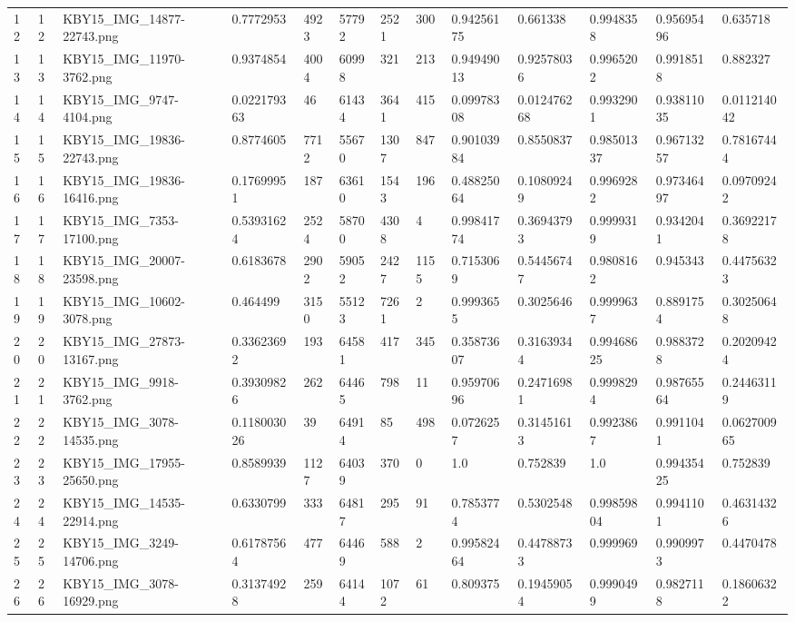 \documentclass[11pt, a4paper, twoside]{report}
\begin{document}
\begin{longtable}[c]{@{}lllllllllllll@{}}
12 & 12 & KBY15\_IMG\_14877-22743.png & 0.7772953 & 4923 & 57792 & 2521 & 300 & 0.94256175 & 0.661338 & 0.9948358 & 0.95695496 & 0.635718 \\
13 & 13 & KBY15\_IMG\_11970-3762.png & 0.9374854 & 4004 & 60998 & 321 & 213 & 0.94949013 & 0.92578036 & 0.9965202 & 0.9918518 & 0.882327 \\
14 & 14 & KBY15\_IMG\_9747-4104.png & 0.022179363 & 46 & 61434 & 3641 & 415 & 0.09978308 & 0.012476268 & 0.9932901 & 0.93811035 & 0.011214042 \\
15 & 15 & KBY15\_IMG\_19836-22743.png & 0.8774605 & 7712 & 55670 & 1307 & 847 & 0.90103984 & 0.8550837 & 0.98501337 & 0.96713257 & 0.78167444 \\
16 & 16 & KBY15\_IMG\_19836-16416.png & 0.17699951 & 187 & 63610 & 1543 & 196 & 0.48825064 & 0.10809249 & 0.9969282 & 0.97346497 & 0.09709242 \\
17 & 17 & KBY15\_IMG\_7353-17100.png & 0.53931624 & 2524 & 58700 & 4308 & 4 & 0.99841774 & 0.36943793 & 0.9999319 & 0.9342041 & 0.36922178 \\
18 & 18 & KBY15\_IMG\_20007-23598.png & 0.6183678 & 2902 & 59052 & 2427 & 1155 & 0.7153069 & 0.54456747 & 0.9808162 & 0.945343 & 0.44756323 \\
19 & 19 & KBY15\_IMG\_10602-3078.png & 0.464499 & 3150 & 55123 & 7261 & 2 & 0.9993655 & 0.3025646 & 0.9999637 & 0.8891754 & 0.30250648 \\
20 & 20 & KBY15\_IMG\_27873-13167.png & 0.33623692 & 193 & 64581 & 417 & 345 & 0.35873607 & 0.31639344 & 0.99468625 & 0.9883728 & 0.20209424 \\
21 & 21 & KBY15\_IMG\_9918-3762.png & 0.39309826 & 262 & 64465 & 798 & 11 & 0.95970696 & 0.24716981 & 0.9998294 & 0.98765564 & 0.24463119 \\
22 & 22 & KBY15\_IMG\_3078-14535.png & 0.118003026 & 39 & 64914 & 85 & 498 & 0.0726257 & 0.31451613 & 0.9923867 & 0.9911041 & 0.062700965 \\
23 & 23 & KBY15\_IMG\_17955-25650.png & 0.8589939 & 1127 & 64039 & 370 & 0 & 1.0 & 0.752839 & 1.0 & 0.99435425 & 0.752839 \\
24 & 24 & KBY15\_IMG\_14535-22914.png & 0.6330799 & 333 & 64817 & 295 & 91 & 0.7853774 & 0.5302548 & 0.99859804 & 0.9941101 & 0.46314326 \\
25 & 25 & KBY15\_IMG\_3249-14706.png & 0.61787564 & 477 & 64469 & 588 & 2 & 0.99582464 & 0.44788733 & 0.999969 & 0.9909973 & 0.4470478 \\
26 & 26 & KBY15\_IMG\_3078-16929.png & 0.31374928 & 259 & 64144 & 1072 & 61 & 0.809375 & 0.19459054 & 0.9990499 & 0.9827118 & 0.18606322 \\

\end{longtable}
\end{document}
